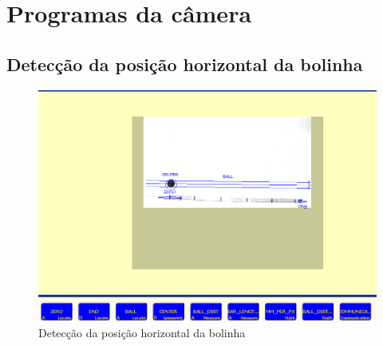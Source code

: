 \newpage

\section{Programas da câmera}
\subsection{Detecção da posição horizontal da bolinha}
\label{ballhorzpos}
\begin{figure}[!ht]
\centering
\includegraphics[width=\linewidth]{figs/presence/programaCaptura}
\caption{Detecção da posição horizontal da bolinha}
\end{figure}